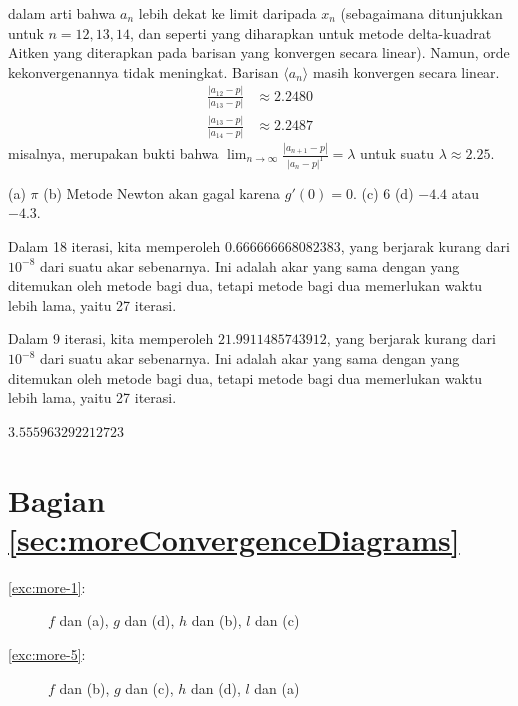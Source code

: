 \begin{description}
dalam arti bahwa $a_{n}$ lebih dekat ke limit daripada $x_{n}$ (sebagaimana
ditunjukkan untuk $n=12,13,14$, dan seperti yang diharapkan untuk
metode delta-kuadrat Aitken yang diterapkan pada barisan yang konvergen
secara linear). Namun, orde kekonvergenannya tidak meningkat. Barisan
$\langle a_{n}\rangle$ masih konvergen secara linear. 
\begin{align*}
\frac{|a_{12}-p|}{|a_{13}-p|} & \approx2.2480\\
\frac{|a_{13}-p|}{|a_{14}-p|} & \approx2.2487
\end{align*}
misalnya, merupakan bukti bahwa $\lim_{n\to\infty}\frac{|a_{n+1}-p|}{|a_{n}-p|^{1}}=\lambda$
untuk suatu $\lambda\approx2.25$.
\item [{\ref{exc:newton-9}:}] (a) $\pi$ (b) Metode Newton akan gagal
karena $g'(0)=0$. (c) 6 (d) $-4.4$ atau $-4.3$.
\item [{\ref{exc:newton-10}c:}] Dalam 18 iterasi, kita memperoleh $0.666666668082383$,
yang berjarak kurang dari $10^{-8}$ dari suatu akar sebenarnya. Ini
adalah akar yang sama dengan yang ditemukan oleh metode bagi dua,
tetapi metode bagi dua memerlukan waktu lebih lama, yaitu 27 iterasi.
\item [{\ref{exc:newton-10}f:}] Dalam 9 iterasi, kita memperoleh $21.9911485743912$,
yang berjarak kurang dari $10^{-8}$ dari suatu akar sebenarnya. Ini
adalah akar yang sama dengan yang ditemukan oleh metode bagi dua,
tetapi metode bagi dua memerlukan waktu lebih lama, yaitu 27 iterasi.
\item [{\ref{exc:newton-13}:}] $3.555963292212723$
\end{description}

\section*{Bagian \ref{sec:moreConvergenceDiagrams}}
\begin{description}
\item [{\ref{exc:more-1}:}] $f$ dan (a), $g$ dan (d), $h$ dan (b),
$l$ dan (c)
\item [{\ref{exc:more-5}:}] $f$ dan (b), $g$ dan (c), $h$ dan (d),
$l$ dan (a)
\end{description}

